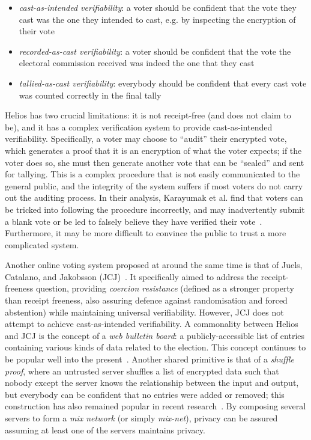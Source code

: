 \documentclass[12pt,a4paper]{article}
\theoremstyle{definition}
\begin{document}
\begin{itemize}
    \item \textit{cast-as-intended verifiability}: a voter should be confident that the vote they cast was the one they intended to cast, e.g. by inspecting the encryption of their vote
    \item \textit{recorded-as-cast verifiability}: a voter should be confident that the vote the electoral commission received was indeed the one that they cast
    \item \textit{tallied-as-cast verifiability}: everybody should be confident that every cast vote was counted correctly in the final tally
\end{itemize}

Helios has two crucial limitations: it is not receipt-free (and does not claim to be), and it has a complex verification system to provide cast-as-intended verifiability. Specifically, a voter may choose to ``audit'' their encrypted vote, which generates a proof that it is an encryption of what the voter expects; if the voter does so, she must then generate another vote that can be ``sealed'' and sent for tallying. This is a complex procedure that is not easily communicated to the general public, and the integrity of the system suffers if most voters do not carry out the auditing process. In their analysis, Karayumak et al. find that voters can be tricked into following the procedure incorrectly, and may inadvertently submit a blank vote or be led to falsely believe they have verified their vote~\cite{karayumak2011usability}. Furthermore, it may be more difficult to convince the public to trust a more complicated system.

Another online voting system proposed at around the same time is that of Juels, Catalano, and Jakobsson (JCJ)~\cite{juels2010coercion}. It specifically aimed to address the receipt-freeness question, providing \textit{coercion resistance} (defined as a stronger property than receipt freeness, also assuring defence against randomisation and forced abstention) while maintaining universal verifiability. However, JCJ does not attempt to achieve cast-as-intended verifiability. A commonality between Helios and JCJ is the concept of a \textit{web bulletin board}: a publicly-accessible list of entries containing various kinds of data related to the election. This concept continues to be popular well into the present~\cite{kiayias2018security}. Another shared primitive is that of a \textit{shuffle proof}, where an untrusted server shuffles a list of encrypted data such that nobody except the server knows the relationship between the input and output, but everybody can be confident that no entries were added or removed; this construction has also remained popular in recent research~\cite{cortier2017machine}. By composing several servers to form a \textit{mix network} (or simply \textit{mix-net}), privacy can be assured assuming at least one of the servers maintains privacy.
\end{document}
